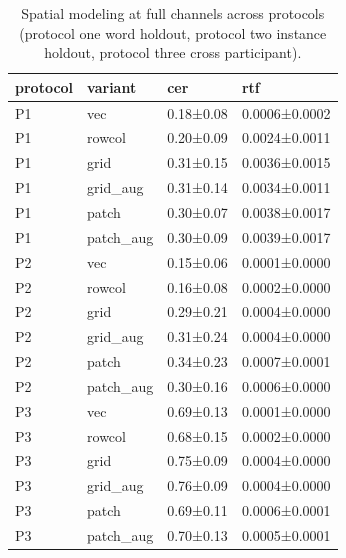 \documentclass{Interspeech}
\begin{document}
\begin{table}[H]
\centering
\small
\setlength{\tabcolsep}{4pt}
\caption{Spatial modeling at full channels across protocols (protocol one word holdout, protocol two instance holdout, protocol three cross participant).}
\label{tab:spatial_all}
\begin{tabular*}{\columnwidth}{@{\extracolsep{\fill}}llll}
\hline
protocol & variant & cer & rtf \\
\hline
P1 & vec & 0.18±0.08 & 0.0006±0.0002 \\
P1 & rowcol & 0.20±0.09 & 0.0024±0.0011 \\
P1 & grid & 0.31±0.15 & 0.0036±0.0015 \\
P1 & grid\_aug & 0.31±0.14 & 0.0034±0.0011 \\
P1 & patch & 0.30±0.07 & 0.0038±0.0017 \\
P1 & patch\_aug & 0.30±0.09 & 0.0039±0.0017 \\
P2 & vec & 0.15±0.06 & 0.0001±0.0000 \\
P2 & rowcol & 0.16±0.08 & 0.0002±0.0000 \\
P2 & grid & 0.29±0.21 & 0.0004±0.0000 \\
P2 & grid\_aug & 0.31±0.24 & 0.0004±0.0000 \\
P2 & patch & 0.34±0.23 & 0.0007±0.0001 \\
P2 & patch\_aug & 0.30±0.16 & 0.0006±0.0000 \\
P3 & vec & 0.69±0.13 & 0.0001±0.0000 \\
P3 & rowcol & 0.68±0.15 & 0.0002±0.0000 \\
P3 & grid & 0.75±0.09 & 0.0004±0.0000 \\
P3 & grid\_aug & 0.76±0.09 & 0.0004±0.0000 \\
P3 & patch & 0.69±0.11 & 0.0006±0.0001 \\
P3 & patch\_aug & 0.70±0.13 & 0.0005±0.0001 \\
\hline
\end{tabular*}
\end{table}
\end{document}
